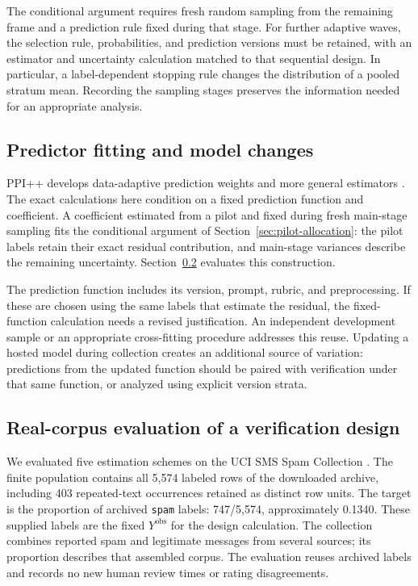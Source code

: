 \documentclass[11pt,a4paper]{article}
\begin{document}
The conditional argument requires fresh random sampling from the remaining frame and a prediction rule fixed during that stage. For further adaptive waves, the selection rule, probabilities, and prediction versions must be retained, with an estimator and uncertainty calculation matched to that sequential design. In particular, a label-dependent stopping rule changes the distribution of a pooled stratum mean. Recording the sampling stages preserves the information needed for an appropriate analysis.

\subsection{Predictor fitting and model changes}

PPI++ develops data-adaptive prediction weights and more general estimators \citep{ppiplus2024}. The exact calculations here condition on a fixed prediction function and coefficient. A coefficient estimated from a pilot and fixed during fresh main-stage sampling fits the conditional argument of Section~\ref{sec:pilot-allocation}: the pilot labels retain their exact residual contribution, and main-stage variances describe the remaining uncertainty. Section~\ref{sec:real-data} evaluates this construction.

The prediction function includes its version, prompt, rubric, and preprocessing. If these are chosen using the same labels that estimate the residual, the fixed-function calculation needs a revised justification. An independent development sample or an appropriate cross-fitting procedure addresses this reuse. Updating a hosted model during collection creates an additional source of variation: predictions from the updated function should be paired with verification under that same function, or analyzed using explicit version strata.


\subsection{Real-corpus evaluation of a verification design}\label{sec:real-data}

We evaluated five estimation schemes on the UCI SMS Spam Collection \citep{sms-data}. The finite population contains all 5,574 labeled rows of the downloaded archive, including 403 repeated-text occurrences retained as distinct row units. The target is the proportion of archived \texttt{spam} labels: 747/5,574, approximately 0.1340. These supplied labels are the fixed $Y^{\mathrm{obs}}$ for the design calculation. The collection combines reported spam and legitimate messages from several sources; its proportion describes that assembled corpus. The evaluation reuses archived labels and records no new human review times or rating disagreements.
\end{document}
